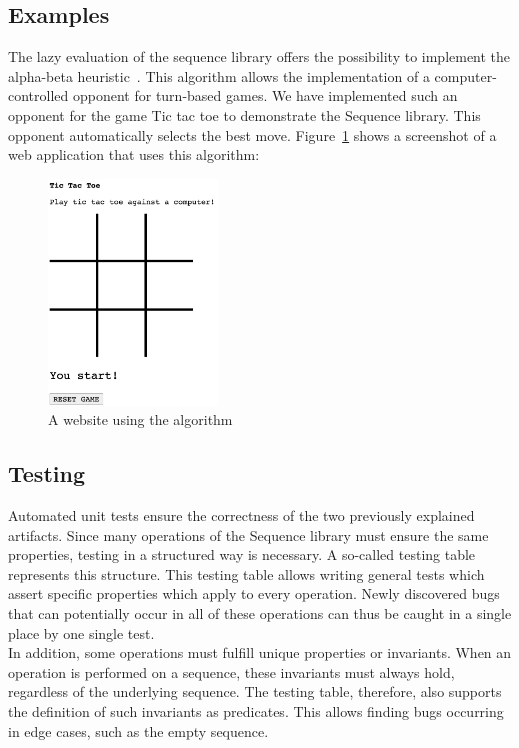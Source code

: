 \subsection*{Examples} %
\label{sub:introduction_Examples}
The lazy evaluation of the sequence library offers the possibility to implement
the alpha-beta heuristic~\cite[Ch. 5]{hughes_why_1989}. 
This algorithm allows the implementation of a computer-controlled opponent for
turn-based games. We have implemented such an opponent for the game Tic tac toe
to demonstrate the Sequence library. This opponent automatically selects the
best move. Figure~\ref{img:intro_ttt_playfield} shows a screenshot of a web
application that uses this algorithm:
\begin{figure}[H]
    \centering
    \includegraphics[width=0.4\textwidth]{./mainmatter/pictures/tic-tac-toe-field.jpg}
    \caption{A website using the algorithm}
    \label{img:intro_ttt_playfield}
\end{figure}

\subsection*{Testing} %
\label{sub:intro_Testing}

Automated unit tests ensure the correctness of the two previously explained
artifacts. Since many operations of the Sequence library must ensure the same
properties, testing in a structured way is necessary. A  so-called testing
table represents this structure. This testing table allows writing general
tests which assert specific properties which apply to every operation. Newly
discovered bugs that can potentially occur in all of these operations can thus
be caught in a single place by one single test.\\
In addition, some operations must fulfill unique properties or invariants. When
an operation is performed on a sequence, these invariants must always hold,
regardless of the underlying sequence. The testing table, therefore, also
supports the definition of such invariants as predicates. This allows finding
bugs occurring in edge cases, such as the empty sequence.

